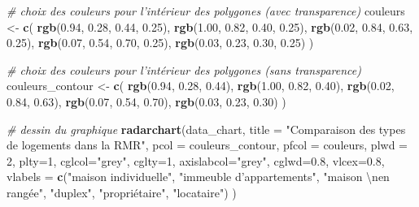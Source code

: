 \documentclass[
  11pt,
  french,
]{book}
\makeatletter
\newenvironment{Shaded}{\begin{snugshade}}{\end{snugshade}}
\newcommand{\CharTok}[1]{\textcolor[rgb]{0.31,0.60,0.02}{#1}}
\newcommand{\CommentTok}[1]{\textcolor[rgb]{0.56,0.35,0.01}{\textit{#1}}}
\newcommand{\DataTypeTok}[1]{\textcolor[rgb]{0.13,0.29,0.53}{#1}}
\newcommand{\DecValTok}[1]{\textcolor[rgb]{0.00,0.00,0.81}{#1}}
\newcommand{\FloatTok}[1]{\textcolor[rgb]{0.00,0.00,0.81}{#1}}
\newcommand{\KeywordTok}[1]{\textcolor[rgb]{0.13,0.29,0.53}{\textbf{#1}}}
\newcommand{\NormalTok}[1]{#1}
\newcommand{\StringTok}[1]{\textcolor[rgb]{0.31,0.60,0.02}{#1}}
\newenvironment{kframe}{%
\medskip{}
\setlength{\fboxsep}{.8em}
 \def\at@end@of@kframe{}%
 \ifinner\ifhmode%
  \def\at@end@of@kframe{\end{minipage}}%
  \begin{minipage}{\columnwidth}%
 \fi\fi%
 \def\FrameCommand##1{\hskip\@totalleftmargin \hskip-\fboxsep
 \colorbox{shadecolor}{##1}\hskip-\fboxsep
     \hskip-\linewidth \hskip-\@totalleftmargin \hskip\columnwidth}%
 \MakeFramed {\advance\hsize-\width
   \@totalleftmargin\z@ \linewidth\hsize
   \@setminipage}}%
 {\par\unskip\endMakeFramed%
 \at@end@of@kframe}
\renewenvironment{Shaded}{\begin{kframe}}{\end{kframe}}
\makeatother
\begin{document}
\begin{Shaded}
\begin{Highlighting}[]
{{\CommentTok{# choix des couleurs pour l'intérieur des polygones (avec transparence)}
\NormalTok{couleurs <-}\StringTok{ }\KeywordTok{c}\NormalTok{(}
  \KeywordTok{rgb}\NormalTok{(}\FloatTok{0.94}\NormalTok{, }\FloatTok{0.28}\NormalTok{, }\FloatTok{0.44}\NormalTok{, }\FloatTok{0.25}\NormalTok{),}
  \KeywordTok{rgb}\NormalTok{(}\FloatTok{1.00}\NormalTok{, }\FloatTok{0.82}\NormalTok{, }\FloatTok{0.40}\NormalTok{, }\FloatTok{0.25}\NormalTok{),}
  \KeywordTok{rgb}\NormalTok{(}\FloatTok{0.02}\NormalTok{, }\FloatTok{0.84}\NormalTok{, }\FloatTok{0.63}\NormalTok{, }\FloatTok{0.25}\NormalTok{),}
  \KeywordTok{rgb}\NormalTok{(}\FloatTok{0.07}\NormalTok{, }\FloatTok{0.54}\NormalTok{, }\FloatTok{0.70}\NormalTok{, }\FloatTok{0.25}\NormalTok{),}
  \KeywordTok{rgb}\NormalTok{(}\FloatTok{0.03}\NormalTok{, }\FloatTok{0.23}\NormalTok{, }\FloatTok{0.30}\NormalTok{, }\FloatTok{0.25}\NormalTok{)}
\NormalTok{)}

\CommentTok{# choix des couleurs pour l'intérieur des polygones (sans transparence)}
\NormalTok{couleurs_contour <-}\StringTok{ }\KeywordTok{c}\NormalTok{(}
  \KeywordTok{rgb}\NormalTok{(}\FloatTok{0.94}\NormalTok{, }\FloatTok{0.28}\NormalTok{, }\FloatTok{0.44}\NormalTok{),}
  \KeywordTok{rgb}\NormalTok{(}\FloatTok{1.00}\NormalTok{, }\FloatTok{0.82}\NormalTok{, }\FloatTok{0.40}\NormalTok{),}
  \KeywordTok{rgb}\NormalTok{(}\FloatTok{0.02}\NormalTok{, }\FloatTok{0.84}\NormalTok{, }\FloatTok{0.63}\NormalTok{),}
  \KeywordTok{rgb}\NormalTok{(}\FloatTok{0.07}\NormalTok{, }\FloatTok{0.54}\NormalTok{, }\FloatTok{0.70}\NormalTok{),}
  \KeywordTok{rgb}\NormalTok{(}\FloatTok{0.03}\NormalTok{, }\FloatTok{0.23}\NormalTok{, }\FloatTok{0.30}\NormalTok{)}
\NormalTok{)}

\CommentTok{# dessin du graphique}
\KeywordTok{radarchart}\NormalTok{(data_chart,}
           \DataTypeTok{title =} \StringTok{"Comparaison des types de logements dans la RMR"}\NormalTok{,}
           \DataTypeTok{pcol =}\NormalTok{ couleurs_contour, }\DataTypeTok{pfcol =}\NormalTok{ couleurs,}
           \DataTypeTok{plwd =} \DecValTok{2}\NormalTok{, }\DataTypeTok{plty=}\DecValTok{1}\NormalTok{,}
           \DataTypeTok{cglcol=}\StringTok{"grey"}\NormalTok{, }\DataTypeTok{cglty=}\DecValTok{1}\NormalTok{, }\DataTypeTok{axislabcol=}\StringTok{"grey"}\NormalTok{, }\DataTypeTok{cglwd=}\FloatTok{0.8}\NormalTok{,}
           \DataTypeTok{vlcex=}\FloatTok{0.8}\NormalTok{,}
           \DataTypeTok{vlabels =} \KeywordTok{c}\NormalTok{(}\StringTok{"maison individuelle"}\NormalTok{, }\StringTok{"immeuble d'appartements"}\NormalTok{,}
                       \StringTok{"maison }\CharTok{\textbackslash{}n}\StringTok{en rangée"}\NormalTok{, }\StringTok{"duplex"}\NormalTok{,}
                       \StringTok{"propriétaire"}\NormalTok{, }\StringTok{"locataire"}\NormalTok{)}
\NormalTok{           )}

}}
\end{Highlighting}
\end{Shaded}
\end{document}
